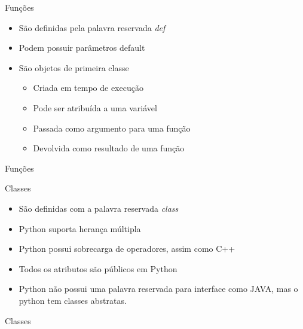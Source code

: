 \begin{frame}{Funções}

\begin{itemize}
	\item São definidas pela palavra reservada \textit{def}
	\item Podem possuir parâmetros default
	\item São objetos de primeira classe
	\begin{itemize}
		\item Criada em tempo de execução
		\item Pode ser atribuída a uma variável
		\item Passada como argumento para uma função		
		\item Devolvida como resultado de uma função
	\end{itemize}
\end{itemize}
\end{frame}


\begin{frame}{Funções}

\centering {}
\lstset{language=Python}

\end{frame}

\begin{frame}{Classes}

\begin{itemize}	
	\item São definidas com a palavra reservada \textit{class}
	\item Python suporta herança múltipla
	\item Python possui sobrecarga de operadores, assim como C++
	\item Todos os atributos são públicos em Python
	\item Python não possui uma palavra reservada para interface como JAVA, mas o python tem classes abstratas.
	
\end{itemize}

\end{frame}

\begin{frame}{Classes }
\centering {}
\lstset{language=Python}

\end{frame}